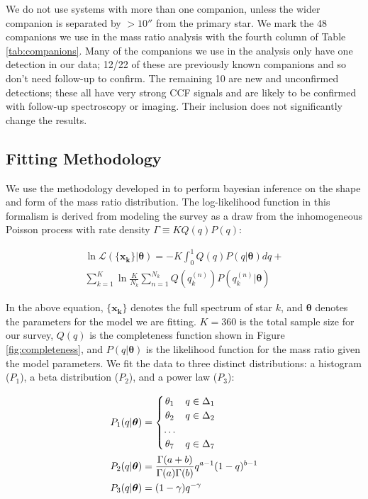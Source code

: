 \documentclass{emulateapj}
\renewcommand{\vec}[1]{\bm{#1}}
\begin{document}
We do not use systems with more than one companion, unless the wider companion is separated by $ > 10''$ from the primary star. We mark the 48 companions we use in the mass ratio analysis with the fourth column of Table \ref{tab:companions}. Many of the companions we use in the analysis only have one detection in our data; 12/22 of these are previously known companions and so don't need follow-up to confirm. The remaining 10 are new and unconfirmed detections; these all have very strong CCF signals and are likely to be confirmed with follow-up spectroscopy or imaging. Their inclusion does not significantly change the results.


\subsection{Fitting  Methodology}

We use the methodology developed in \citet{Foreman2014} to perform bayesian inference on the shape and form of the mass ratio distribution. The log-likelihood function in this formalism is derived from modeling the survey as a draw from the inhomogeneous Poisson process with rate density $\Gamma \equiv KQ(q)P(q)$:

\begin{multline}
\ln{\mathcal{L}(\{\vec{x_k}\}| \vec{\theta})} = -K \int_0^1 Q(q)P(q|\vec{\theta})dq + \\ \sum_{k=1}^K \ln{\frac{K}{N_k} \sum_{n=1}^{N_k} Q(q_k^{(n)}) P(q_k^{(n)}|\vec{\theta})}
\label{eqn:money}
\end{multline}

In the above equation, $\{\vec{x_k}\}$ denotes the full spectrum of star $k$, and $\vec{\theta}$ denotes the parameters for the model we are fitting. $K=360$ is the total sample size for our survey, $Q(q)$ is the completeness function shown in Figure \ref{fig:completeness}, and $P(q|\vec{\theta})$ is the likelihood function for the mass ratio given the model parameters. We fit the data to three distinct distributions: a histogram ($P_1$), a beta distribution ($P_2$), and a power law ($P_3$):

\begin{align}
 P_1(q|\vec{\theta}) &= \begin{cases}
      \hfill \theta_1 \hfill & q \in \Delta_1 \\
      \hfill \theta_2 \hfill & q \in \Delta_2 \\
      \hfill \ldots \\
      \hfill \theta_7 \hfill & q \in \Delta_7
     \end{cases} \label{eqn:P1} \\
 P_2(q|\vec{\theta}) &= \frac{\Gamma(a+b)}{\Gamma(a)\Gamma(b)} q^{a-1}(1-q)^{b-1} \\
 P_3(q|\vec{\theta}) &= (1-\gamma)q^{-\gamma} \label{eqn:P3}
\end{align}
\end{document}
